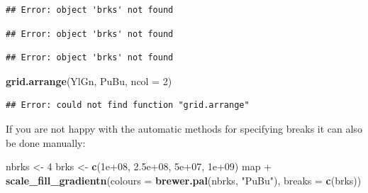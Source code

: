 \documentclass[]{article}
\newenvironment{Shaded}{}{}
\newcommand{\KeywordTok}[1]{\textcolor[rgb]{0.00,0.44,0.13}{\textbf{{#1}}}}
\newcommand{\DataTypeTok}[1]{\textcolor[rgb]{0.56,0.13,0.00}{{#1}}}
\newcommand{\DecValTok}[1]{\textcolor[rgb]{0.25,0.63,0.44}{{#1}}}
\newcommand{\FloatTok}[1]{\textcolor[rgb]{0.25,0.63,0.44}{{#1}}}
\newcommand{\StringTok}[1]{\textcolor[rgb]{0.25,0.44,0.63}{{#1}}}
\newcommand{\CommentTok}[1]{\textcolor[rgb]{0.38,0.63,0.69}{\textit{{#1}}}}
\newcommand{\NormalTok}[1]{{#1}}
\begin{document}
\begin{verbatim}
## Error: object 'brks' not found
\end{verbatim}

\begin{Shaded}
\end{Shaded}

\begin{verbatim}
## Error: object 'brks' not found
\end{verbatim}

\begin{Shaded}
\end{Shaded}

\begin{verbatim}
## Error: object 'brks' not found
\end{verbatim}

\begin{Shaded}
\begin{Highlighting}[]

\KeywordTok{grid.arrange}\NormalTok{(YlGn, PuBu, }\DataTypeTok{ncol =} \DecValTok{2}\NormalTok{)}
\end{Highlighting}
\end{Shaded}

\begin{verbatim}
## Error: could not find function "grid.arrange"
\end{verbatim}

If you are not happy with the automatic methods for specifying breaks it
can also be done manually:

\begin{Shaded}
\begin{Highlighting}[]
\NormalTok{nbrks <-}\StringTok{ }\DecValTok{4}
\NormalTok{brks <-}\StringTok{ }\KeywordTok{c}\NormalTok{(}\FloatTok{1e+08}\NormalTok{, }\FloatTok{2.5e+08}\NormalTok{, }\FloatTok{5e+07}\NormalTok{, }\FloatTok{1e+09}\NormalTok{)}
\NormalTok{map +}\StringTok{ }\KeywordTok{scale_fill_gradientn}\NormalTok{(}\DataTypeTok{colours =} \KeywordTok{brewer.pal}\NormalTok{(nbrks, }\StringTok{"PuBu"}\NormalTok{), }\DataTypeTok{breaks =} \KeywordTok{c}\NormalTok{(brks))}
\end{Highlighting}
\end{Shaded}
\end{document}
